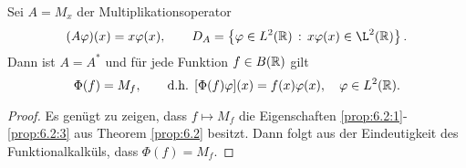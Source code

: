 \begin{bsp*}
\begin{bspenum}
\item Sei $A=M_x$ der Multiplikationsoperator
\begin{align*}
(A\ph)(x) = x\ph(x),\qquad D_A = \setdef{\ph\in L^2(\R)}{x\ph(x)\in\L^2(\R)}.
\end{align*}
Dann ist $A=A^*$ und für jede Funktion $f\in B(\mathbb{R})$ gilt
\[
\Phi(f) = M_f,\qquad \text{d.h. } [\Phi(f)\varphi](x) =f(x)\varphi(x),\quad \varphi\in
L^2(\mathbb{R}).
\]
\begin{proof}
Es genügt zu zeigen, dass $f\mapsto M_f$ die Eigenschaften
\ref{prop:6.2:1}-\ref{prop:6.2:3} aus Theorem \ref{prop:6.2} besitzt. Dann folgt
aus der Eindeutigkeit des Funktionalkalküls, dass $\Phi(f) = M_f$.\qedhere

% 
% 

\end{proof}
\end{bspenum}
\end{bsp*}
